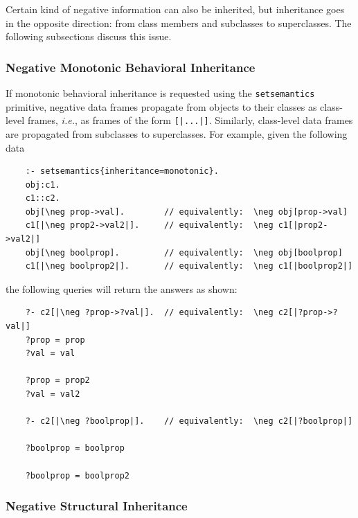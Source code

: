\documentclass[11pt]{article}
\begin{document}
Certain kind of negative information can also be inherited, but inheritance
goes in the opposite direction: from class members and subclasses to
superclasses. The following
subsections discuss this issue.

\subsubsection{Negative Monotonic Behavioral Inheritance}

If monotonic behavioral inheritance is requested using the
\texttt{setsemantics} primitive, negative data frames propagate from
objects to their classes as class-level frames, {\it i.e.}, as frames of
the form \texttt{[|...|]}.  Similarly, class-level data frames are
propagated from subclasses to superclasses. For example, given the
following data
\begin{verbatim}
    :- setsemantics{inheritance=monotonic}.
    obj:c1.
    c1::c2.
    obj[\neg prop->val].        // equivalently:  \neg obj[prop->val]
    c1[|\neg prop2->val2|].     // equivalently:  \neg c1[|prop2->val2|]
    obj[\neg boolprop].         // equivalently:  \neg obj[boolprop]
    c1[|\neg boolprop2|].       // equivalently:  \neg c1[|boolprop2|]
\end{verbatim}
the following queries will return the answers as shown:
\begin{verbatim}
    ?- c2[|\neg ?prop->?val|].  // equivalently:  \neg c2[|?prop->?val|]
    ?prop = prop
    ?val = val

    ?prop = prop2
    ?val = val2

    ?- c2[|\neg ?boolprop|].    // equivalently:  \neg c2[|?boolprop|]

    ?boolprop = boolprop

    ?boolprop = boolprop2
\end{verbatim}


\subsubsection{Negative Structural Inheritance}
\end{document}
